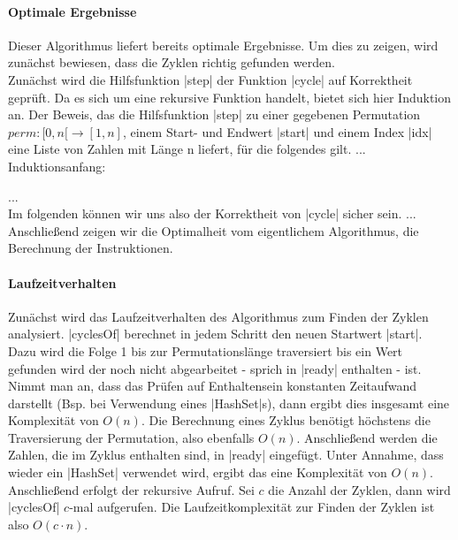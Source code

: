 \paragraph{Optimale Ergebnisse}
Dieser Algorithmus liefert bereits optimale Ergebnisse. Um dies zu zeigen, wird zunächst bewiesen, dass die Zyklen richtig gefunden werden. \\
Zunächst wird die Hilfsfunktion |step| der Funktion |cycle| auf Korrektheit geprüft. Da es sich um eine rekursive Funktion handelt, bietet sich hier Induktion an.
Der Beweis, das die Hilfsfunktion |step| zu einer gegebenen Permutation $perm: [0,n[ \rightarrow [1,n]$, einem Start- und Endwert |start| und einem Index |idx|
eine Liste von Zahlen mit Länge n liefert, für die folgendes gilt. ... \\
Induktionsanfang:

... \\
Im folgenden können wir uns also der Korrektheit von |cycle| sicher sein. 
... \\
Anschließend zeigen wir die Optimalheit vom eigentlichem Algorithmus, die Berechnung der Instruktionen.

\paragraph{Laufzeitverhalten}
Zunächst wird das Laufzeitverhalten des Algorithmus zum Finden der Zyklen analysiert.
|cyclesOf| berechnet in jedem Schritt den neuen Startwert |start|.
Dazu wird die Folge 1 bis zur Permutationslänge traversiert bis ein Wert gefunden wird der noch nicht abgearbeitet - sprich in |ready| enthalten - ist.
Nimmt man an, dass das Prüfen auf Enthaltensein konstanten Zeitaufwand darstellt (Bsp. bei Verwendung eines |HashSet|s), dann ergibt dies insgesamt eine Komplexität von $O(n)$.
Die Berechnung eines Zyklus benötigt höchstens die Traversierung der Permutation, also ebenfalls $O(n)$. %
Anschließend werden die Zahlen, die im Zyklus enthalten sind, in |ready| eingefügt. Unter Annahme, dass wieder ein |HashSet| verwendet wird, ergibt das eine Komplexität von $O(n)$.
Anschließend erfolgt der rekursive Aufruf. Sei $c$ die Anzahl der Zyklen, dann wird |cyclesOf| $c$-mal aufgerufen.
Die Laufzeitkomplexität zur Finden der Zyklen ist also $O(c \cdot n)$. \\

